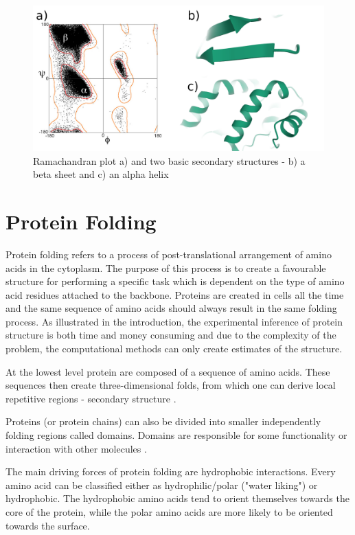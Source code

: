 \begin{figure}
    \centering
    \includegraphics[width=\linewidth]{imgs_tomas/secondary.png}
    \caption{Ramachandran plot \cite{ramachandran} a) and two basic secondary structures - b) a beta sheet and c) an alpha helix \cite{pdb}}
    \label{fig:ramachandran}
\end{figure}

\section{Protein Folding}

Protein folding refers to a process of post-translational arrangement of amino acids in the cytoplasm. 
The purpose of this process is to create a favourable structure for performing a specific task which is dependent on the type of amino acid residues attached to the backbone. 
Proteins are created in cells all the time and the same sequence of amino acids should always result in the same folding process. 
As illustrated in the introduction, the experimental inference of protein structure is both time and money consuming and due to the complexity of the problem, the computational methods can only create estimates of the structure.

At the lowest level protein are composed of a sequence of amino acids. 
These sequences then create three-dimensional folds, from which one can derive local repetitive regions - secondary structure \cite{dill}. 

Proteins (or protein chains) can also be divided into smaller independently folding regions called domains. 
Domains are responsible for some functionality or interaction with other molecules \cite{domains}.

The main driving forces of protein folding are hydrophobic interactions. 
Every amino acid can be classified either as hydrophilic/polar ("water liking") or hydrophobic. 
The hydrophobic amino acids tend to orient themselves towards the core of the protein, while the polar amino acids are more likely to be oriented towards the surface.

